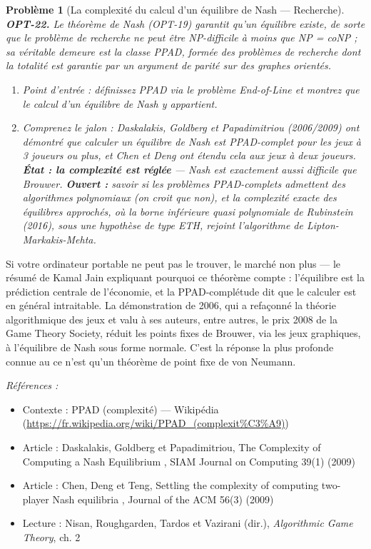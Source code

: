 \documentclass[11pt]{article}
\newtheorem{problem}{Problème}
\newenvironment{refs}{\par\small\noindent\emph{Références :}\begin{itemize}\setlength\itemsep{0pt}}{\end{itemize}\normalsize}
\begin{document}
\bigskip

\begin{problem}[{La complexité du calcul d'un équilibre de Nash --- Recherche}]
\textbf{OPT-22.} Le théorème de Nash (OPT-19) garantit qu'un équilibre existe, de sorte que le problème de recherche ne peut être NP-difficile à moins que NP = coNP ; sa véritable demeure est la classe PPAD, formée des problèmes de recherche dont la totalité est garantie par un argument de parité sur des graphes orientés.
\begin{enumerate}
\item[(a)] Point d'entrée : définissez PPAD via le problème End-of-Line et montrez que le calcul d'un équilibre de Nash y appartient.
\item[(b)] Comprenez le jalon : Daskalakis, Goldberg et Papadimitriou (2006/2009) ont démontré que calculer un équilibre de Nash est PPAD-complet pour les jeux à 3 joueurs ou plus, et Chen et Deng ont étendu cela aux jeux à deux joueurs. \textbf{État : la complexité est réglée} --- Nash est exactement aussi difficile que Brouwer. \textbf{Ouvert :} savoir si les problèmes PPAD-complets admettent des algorithmes polynomiaux (on croit que non), et la complexité exacte des équilibres \textit{approchés}, où la borne inférieure quasi polynomiale de Rubinstein (2016), sous une hypothèse de type ETH, rejoint l'algorithme de Lipton-Markakis-Mehta.
\end{enumerate}

\end{problem}

\noindent \og{} Si votre ordinateur portable ne peut pas le trouver, le marché non plus \fg{} --- le résumé de Kamal Jain expliquant pourquoi ce théorème compte : l'équilibre est la prédiction centrale de l'économie, et la PPAD-complétude dit que le calculer est en général intraitable. La démonstration de 2006, qui a refaçonné la théorie algorithmique des jeux et valu à ses auteurs, entre autres, le prix 2008 de la Game Theory Society, réduit les points fixes de Brouwer, via les jeux graphiques, à l'équilibre de Nash sous forme normale. C'est la réponse la plus profonde connue au \og{} ce n'est qu'un théorème de point fixe \fg{} de von Neumann.

\begin{refs}
\item Contexte : PPAD (complexité) --- Wikipédia (\url{https://fr.wikipedia.org/wiki/PPAD_(complexit%C3%A9)})
\item Article : Daskalakis, Goldberg et Papadimitriou, \og{} The Complexity of Computing a Nash Equilibrium \fg{}, SIAM Journal on Computing 39(1) (2009)
\item Article : Chen, Deng et Teng, \og{} Settling the complexity of computing two-player Nash equilibria \fg{}, Journal of the ACM 56(3) (2009)
\item Lecture : Nisan, Roughgarden, Tardos et Vazirani (dir.), \textit{Algorithmic Game Theory}, ch. 2
\end{refs}
\end{document}
